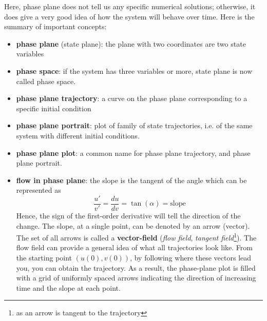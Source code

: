 Here, phase plane does not tell us any specific numerical solutions; otherwise,
it does give a very good idea of how the system will behave over
time. Here is the summary of important concepts:
\begin{itemize}

\item {\bf phase plane} (state plane): the plane with two coordinates
  are two state variables

\item {\bf phase space}: if the system has three variables or more,
  state plane is now called phase space.

\item {\bf phase plane trajectory}: a curve on the phase plane
  corresponding to a specific initial condition

\item {\bf phase plane portrait}: plot of family of state
  trajectories, i.e. of the same system with different initial
  conditions.

\item {\bf phase plane plot}: a common name for phase plane
  trajectory, and phase plane portrait.


\item {\bf flow in phase plane}: the slope is the tangent of the angle
  which can be represented as
  \begin{equation}
    \label{eq:105}
    \frac{u'}{v'} = \frac{du}{dv} = \tan(\alpha) = \text{slope}
  \end{equation}
  Hence, the sign of the first-order derivative will tell the
  direction of the change. The slope, at a single point, can be
  denoted by an arrow (vector). The set of all arrows is called a
  {\bf vector-field} ({\it flow field},
  {\it tangent
    field}\footnote{as
    an arrow is tangent to the trajectory}).
  The flow field can provide a general idea of what all trajectories
  look like. From the starting point $(u(0),v(0))$, by following where
  these vectors lead you, you can obtain the trajectory. As a result,
  the phase-plane plot is filled with a grid of uniformly spaced
  arrows indicating the direction of increasing time and the slope at
  each point.



\end{itemize}
